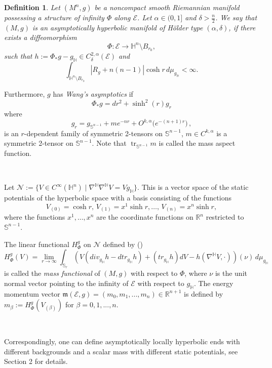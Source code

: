 \documentclass[11pt]{amsart}
\newtheorem{defn}{Definition}[section]
\theoremstyle{remark}
\numberwithin{equation}{section}
\def\tr{\operatorname{tr}}
\def\a{{\alpha}}
\def\b{{\beta}}
\def\R{\mathbb{R}}
\def\d{\frac {\operatorname d}{\operatorname {dt}}}
\def\Na{\nabla}
\def\d{\delta}
\def\m{\mathfrak{m}}
\def\mE{\mathcal{E}}
\def\mE{\mathcal{E}}
\def\HH{\mathbb{H}}
\def\mN{\mathcal{N}}
\def\gH{g_{\HH}}
\def\mS{\mathbb{S}}
\def\nS{\mathbb{S}}
\begin{document}
{{\begin{defn} \label{defAHmanifold} 
Let $(M^n,g)$ be a noncompact smooth Riemannian manifold possessing a structure of infinity $\Phi$ along $\mathcal E$. Let $\a\in (0,1]$ and $\d>\frac{n}{2}$. 
We say that $(M, g)$ is an asymptotically hyperbolic 
manifold of H\"older type $(\a,\d)$, 
if there exists a diffeomorphism
\[
\Phi: \mE \to \HH^n \setminus B_{r_0}, 
\]
such that $h:=\Phi_* g - \gH \in C^{2, \a}_{\d}(\mE)$ and 
\begin{equation} \label{decay2}
\int_{\HH^n \setminus B_{r_0}} |R_g + n(n-1)| \cosh r \, d\mu_{\gH} < \infty. 
\end{equation}
\end{defn}

Furthermore, $g$ has \textit{Wang's asymptotics} if 
\begin{equation*}
    \Phi_*g = dr^2 + \sinh^2(r) g_r
\end{equation*}
where
\begin{equation*}
    g_r = g_{\nS^{n-1}} + m e^{-nr} + O^{k,\alpha}\bigl(e^{-(n+1)r}\bigr) \,,
\end{equation*}
is an $r$-dependent family of symmetric 2-tensors on $\mathbb{S}^{n-1}$, $ m\in C^{k,\a}$ is a symmetric 2-tensor on $\mathbb{S}^{n-1}$. Note that $\tr_{\mathbb{S}^{n-1}} m$ is called the mass aspect function. 

\

Let 
$\mN := \{ V \in C^{\infty}(\HH^n) \mid \Na^{\HH}\Na^{\HH} V = V g_\HH \}$.
This is a vector space of the static potentials of the hyperbolic space with a basis consisting of the functions 
\[
V_{(0)} = \cosh r, \, 
V_{(1)} = x^1 \sinh r, \dots , \,
V_{(n)} = x^n \sinh r,
\]
where the functions $x^1, \dots, x^n$ are the coordinate functions
on $\R^{n}$ restricted to $\mS^{n-1}$. 

The linear functional $H^g_{\Phi}$ on $\mN$ defined by (\cite{XW, CH03})
\[
H_{\Phi}^g (V)
= \lim_{r \to \infty} \int_{\mS_r} \left(
V (div_{\gH} h- d tr_{\gH} h) + (tr_{\gH} h) dV - h(\nabla^{\HH} V, \cdot)
\right) (\nu) \, d \mu_{\gH}
\] 
is called the {\em mass functional} of $(M,g)$ with respect to $\Phi$, where $\nu$ is the unit normal vector pointing to the infinity of $\mE$ with respect to $g_{\HH}$. The energy momentum vector $\m(\mE, g)=(m_0,m_1,...,m_n)\in \R^{n+1}$ is defined by $m_{\b}:=H^g_{\Phi}(V_{(\b)})$ for $\b=0,1,...,n$. 

\

Correspondingly, one can define asymptotically locally hyperbolic ends with different backgrounds and a scalar mass with different static potentials, see \cite{HJ} Section 2 for details. 

}}
\end{document}
